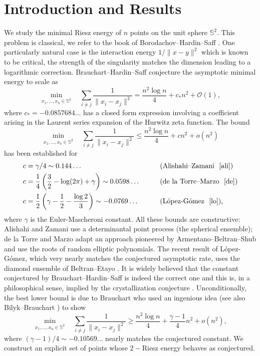 \documentclass[10pt, reqno]{amsart}
\begin{document}
\section{Introduction and Results}
We study the minimal Riesz energy of $n$ points on the unit sphere $\mathbb{S}^2$. This problem is classical, we refer to the book of Borodachov--Hardin--Saff \cite{boro}. One particularly natural case is the interaction energy $1/\|x-y\|^2$ which is known to be critical, the strength of the singularity matches the dimension leading to a logarithmic correction.
Brauchart--Hardin--Saff \cite[Conjecture 5]{bhs} conjecture the asymptotic minimal energy to scale as
$$ \min_{x_1, \dots, x_n \in \mathbb{S}^2} \quad  \sum_{i \neq j} \frac{1}{\|x_i - x_j\|^2} =  \frac{n^2 \log{n}}{4} + c_* n^2 + \mathcal{O}(1),$$
where $c_* = -0.0857684\dots$ has a closed form expression involving a coefficient arising in the Laurent series expansion of the Hurwitz zeta function. The bound
$$ \min_{x_1, \dots, x_n \in \mathbb{S}^2} \quad  \sum_{i \neq j} \frac{1}{\|x_i - x_j\|^2} \leq  \frac{n^2 \log{n}}{4} + c n^2 + o(n^2)$$
has been established for
\begin{align*}
c &= \gamma/4  \sim0.144\dots \qquad && \text{(\mbox{Alishahi--Zamani } \cite{ali})}\\
c &= \frac{1}{4} \left(\frac{3}{2} - \log(2\pi) + \gamma\right)  \sim0.0598\dots \qquad && \text{(\mbox{de la Torre--Marzo } \cite{de})} \\
c &= \frac{1}{2}\left(\gamma - \frac{1}{2} - \frac{\log{2}}{3} \right)  \sim-0.0769 \dots \qquad && \text{(\mbox{L\'opez-G\'omez } \cite{lo}),}
\end{align*}
where $\gamma$ is the Euler-Mascheroni constant.
All these bounds are constructive:
Alishahi and Zamani use a determinantal point process (the spherical ensemble); de la Torre and Marzo adapt an approach pioneered by Armentano--Beltran--Shub \cite{arm} and use the roots of random elliptic polynomials. The recent result of L\'opez-G\'omez, which very nearly matches the conjectured asymptotic rate, uses the diamond ensemble of Beltran--Etayo \cite{beltran}. It is widely believed that the constant conjectured by Brauchart--Hardin--Saff is indeed the correct one and this is, in a philosophical sense, implied by the crystallization conjecture \cite{crys}. Unconditionally, the best lower bound is due to Brauchart \cite{brauchart} who used an ingenious idea (see also Bilyk--Brauchart \cite{brauchart2}) to show
$$   \min_{x_1, \dots, x_n \in \mathbb{S}^2} \quad  \sum_{i \neq j} \frac{1}{\|x_i - x_j\|^2} \geq  \frac{n^2 \log{n}}{4} +  \frac{\gamma - 1}{4} n^2 + o(n^2),$$
where
$(\gamma - 1)/4 \sim - 0.10569 \dots$
nearly matches the conjectured constant. We construct an explicit set of points whose $2-$Riesz energy behaves as conjectured.
\end{document}
